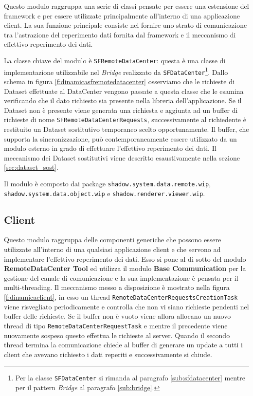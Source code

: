 Questo modulo raggruppa una serie di classi pensate per essere una estensione del framework e per essere utilizzate principalmente all'interno di una applicazione client.
La sua funzione principale consiste nel fornire uno strato di comunicazione tra l'astrazione del reperimento dati fornita dal framework e il meccanismo di effettivo reperimento dei dati.

La classe chiave del modulo \`e \texttt{SFRemoteDataCenter}: questa \`e una classe di implementazione utilizzabile nel \textit{Bridge} realizzato da \texttt{SFDataCenter}\footnote{Per la classe \texttt{SFDataCenter} si rimanda al paragrafo \ref{sub:sfdatacenter} mentre per il pattern \textit{Bridge} al paragrafo \ref{sub:bridge}.}.
Dallo schema in figura \ref{f:dinamicasfremotedatacenter} osserviamo che le richieste di Dataset effettuate al DataCenter vengono passate a questa classe che le esamina verificando che il dato richiesto sia presente nella libreria dell'applicazione. Se il Dataset non \`e presente viene generata una richiesta e aggiunta ad un buffer di richieste di nome \texttt{SFRemoteDataCenterRequests}, successivamente al richiedente \`e restituito un Dataset sostitutivo temporaneo scelto opportunamente. Il buffer, che supporta la sincronizzazione, pu\`o contemporaneamente essere utilizzato da un modulo esterno in grado di effettuare l'effettivo reperimento dei dati.
Il meccanismo dei Dataset sostitutivi viene descritto esaustivamente nella sezione \ref{sec:dataset_sost}.

Il modulo \`e composto dai package \texttt{shadow.system.data.remote.wip}, \texttt{shadow.system.data.object.wip} e \texttt{shadow.renderer.viewer.wip}.

\subsection{Client}
\label{sub:clientmodule}
Questo modulo raggruppa delle componenti generiche che possono essere utilizzate all'interno di una qualsiasi applicazione client e che servono ad implementare l'effettivo reperimento dei dati. 
Esso si pone al di sotto del modulo \textbf{RemoteDataCenter Tool} ed utilizza il modulo \textbf{Base Communication} per la gestione del canale di comunicazione e la sua implementazione \`e pensata per il multi-threading.
Il meccanismo messo a disposizione \`e mostrato nella figura \ref{f:dinamicaclient}, in esso un thread \texttt{RemoteDataCenterRequestsCreationTask} viene risvegliato periodicamente e controlla che non vi siano richieste pendenti nel buffer delle richieste. Se il buffer non \`e vuoto viene allora allocano un nuovo thread di tipo \texttt{RemoteDataCenterRequestTask} e mentre il precedente viene nuovamente sospeso questo effettua le richieste al server. Quando il secondo thread termina la comunicazione chiede al buffer di generare un update a tutti i client che avevano richiesto i dati reperiti e successivamente si chiude.


